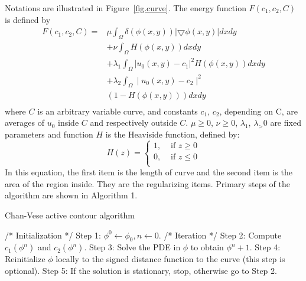 Notations are illustrated in Figure~\ref{fig.curve}. The energy function $F(c_1, c_2, C)$ is defined by\\
\begin{align*}
F(c_1, c_2, C) =&\mu \int_{\Omega}\delta(\phi (x, y))|\bigtriangledown\phi(x, y)|{d}x{d}y\\
                    &+\nu \int_{\Omega}H(\phi (x, y)){d}x{d}y\\
                    &+\lambda _1\int_{\Omega}|u_0(x, y)-c_1|^2H(\phi (x, y)){d}x {d}y\\
                    &+\lambda _2\int_{\Omega}\mid u_0(x, y)-c_2\mid ^2\\
                    &(1-H(\phi (x, y))){d}x{d}y\\
\end{align*}
where $C$ is an arbitrary variable curve, and constants $c_1$, $c_2$, depending on C, are averages of $u_0$ inside $C$ and respectively outside $C$. $\mu \geq0$, $\nu \geq0$, $\lambda _1$, $\lambda _>0$ are fixed parameters and function $H$ is the Heaviside function, defined by:
\begin{equation}
H(z)=
\begin{cases}
1,  &\mbox{ if $z \geq 0$}\\
0,  &\mbox{ if $z \leq 0$}\\
\end{cases}
\end{equation}
In this equation, the first item is the length of curve and the second item is the area of the region inside. They are the regularizing items.
Primary steps of the algorithm are shown in Algorithm 1.
\begin{algorithm}
\caption{Chan-Vese active contour algorithm}
\begin{algorithmic}
\STATE /* Initialization */
\STATE Step 1: $\phi^0\leftarrow\phi _0, n\leftarrow0$.
\STATE /* Iteration */
\STATE Step 2: Compute $c_1(\phi^n)$ and $c_2(\phi^n)$.
\STATE Step 3: Solve the PDE in $\phi$ to obtain $\phi^n+1$.
\STATE Step 4: Reinitialize $\phi$ locally to the signed distance function to the curve (this step is optional).
\STATE Step 5: If the solution is stationary, stop,
\STATE \qquad \qquad otherwise go to Step 2.
\end{algorithmic}
\end{algorithm}

